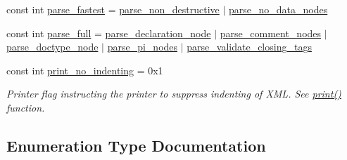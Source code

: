 \begin{DoxyCompactItemize}
\item 
const int \hyperlink{namespacerapidxml_a64da06dfdab7c86ca954bda4fecb978f}{parse\+\_\+fastest} = \hyperlink{namespacerapidxml_a45d4d8fef551beaaba23a83b847fd6a3}{parse\+\_\+non\+\_\+destructive} $\vert$ \hyperlink{namespacerapidxml_ac2d21ef14a4e8936b94aca5d38b1a74d}{parse\+\_\+no\+\_\+data\+\_\+nodes}
\item 
const int \hyperlink{namespacerapidxml_abb48dc65db75d9e49734bc5bd2fabbfc}{parse\+\_\+full} = \hyperlink{namespacerapidxml_a999d782659513f8015ea4236e3204c42}{parse\+\_\+declaration\+\_\+node} $\vert$ \hyperlink{namespacerapidxml_ae093dd49e2f59fa39eee95f1a6568e32}{parse\+\_\+comment\+\_\+nodes} $\vert$ \hyperlink{namespacerapidxml_a41002b49780a90a0bbcc28ce8b895fe4}{parse\+\_\+doctype\+\_\+node} $\vert$ \hyperlink{namespacerapidxml_a03fe68fcf5d28f38476e0fd31adecc4c}{parse\+\_\+pi\+\_\+nodes} $\vert$ \hyperlink{namespacerapidxml_a7ce8f40fda68338e20b56f41e48e49f3}{parse\+\_\+validate\+\_\+closing\+\_\+tags}
\item 
const int \hyperlink{namespacerapidxml_a65477b812a80f5bda693ec57e57de064}{print\+\_\+no\+\_\+indenting} = 0x1
\begin{DoxyCompactList}\small\item\em Printer flag instructing the printer to suppress indenting of X\+M\+L. See \hyperlink{namespacerapidxml_a0fb0be6eba49fb2e2646d5a72a0dc355}{print()} function. \end{DoxyCompactList}\end{DoxyCompactItemize}


\subsection{Enumeration Type Documentation}
\hypertarget{namespacerapidxml_abb456db38f7efb746c4330eed6072a7c}{}
